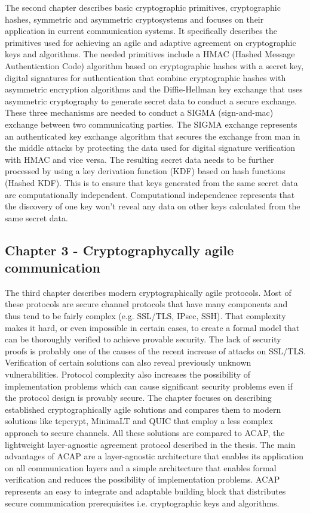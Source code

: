 The second chapter describes basic cryptographic primitives, cryptographic
hashes, symmetric and asymmetric cryptosystems and focuses on their application
in current communication systems. It specifically describes the primitives used
for achieving an agile and adaptive agreement on cryptographic keys and
algorithms. The needed primitives include a HMAC (Hashed Message Authentication
Code) algorithm based on cryptographic hashes with a secret key, digital
signatures for authentication that combine cryptographic hashes with asymmetric
encryption algorithms and the Diffie-Hellman key exchange that uses asymmetric
cryptography to generate secret data to conduct a secure exchange. These three
mechanisms are needed to conduct a SIGMA (sign-and-mac) exchange between two
communicating parties. The SIGMA exchange represents an authenticated key
exchange algorithm that secures the exchange from man in the middle attacks by
protecting the data used for digital signature verification with HMAC and
vice versa. The resulting secret data needs to be further processed by
using a key derivation function (KDF) based on hash functions (Hashed KDF). This
is to ensure that keys generated from the same secret data are computationally
independent. Computational independence represents that the discovery of one key
won't reveal any data on other keys calculated from the same secret data.

\subsection*{Chapter 3 - Cryptographycally agile communication}

The third chapter describes modern cryptographically agile protocols. Most of
these protocols are secure channel protocols that have many components and thus
tend to be fairly complex (e.g. SSL/TLS, IPsec, SSH). That complexity makes it
hard, or even impossible in certain cases, to create a formal model that can be
thoroughly verified to achieve provable security. The lack of security proofs is
probably one of the causes of the recent increase of attacks on SSL/TLS.
Verification of certain solutions can also reveal previously unknown
vulnerabilities. Protocol complexity also increases the possibility
of implementation problems which can cause significant security problems even if
the protocol design is provably secure. The chapter focuses on describing
established cryptographically agile solutions and compares them to modern
solutions like tcpcrypt, MinimaLT and QUIC that employ a less complex approach
to secure channels. All these solutions are compared to ACAP, the lightweight
layer-agnostic agreement protocol described in the thesis. The main advantages
of ACAP are a layer-agnostic architecture that enables its application on all
communication layers and a simple architecture that enables formal verification
and reduces the possibility of implementation problems. ACAP represents an easy
to integrate and adaptable building block that distributes secure communication
prerequisites i.e. cryptographic keys and algorithms.

